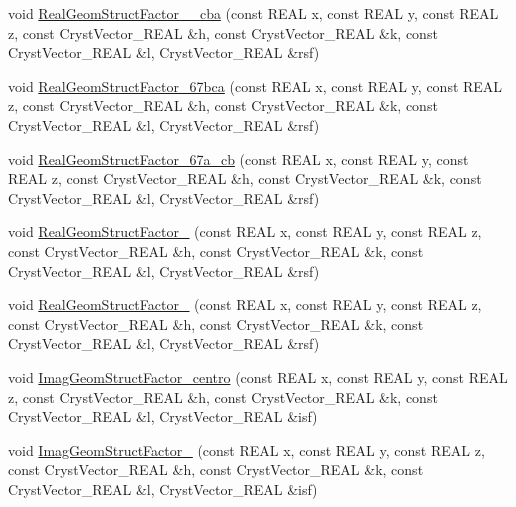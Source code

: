 \begin{DoxyCompactItemize}
\item 
void \mbox{\hyperlink{namespace_obj_cryst_a7a4f122c474f2e0c78797deeb453a7c2}{Real\+Geom\+Struct\+Factor\+\_\+\_\+cba}} (const R\+E\+AL x, const R\+E\+AL y, const R\+E\+AL z, const Cryst\+Vector\+\_\+\+R\+E\+AL \&h, const Cryst\+Vector\+\_\+\+R\+E\+AL \&k, const Cryst\+Vector\+\_\+\+R\+E\+AL \&l, Cryst\+Vector\+\_\+\+R\+E\+AL \&rsf)
\item 
void \mbox{\hyperlink{namespace_obj_cryst_a5838f57e66d4218cf94c2654970e4b44}{Real\+Geom\+Struct\+Factor\+\_\+67bca}} (const R\+E\+AL x, const R\+E\+AL y, const R\+E\+AL z, const Cryst\+Vector\+\_\+\+R\+E\+AL \&h, const Cryst\+Vector\+\_\+\+R\+E\+AL \&k, const Cryst\+Vector\+\_\+\+R\+E\+AL \&l, Cryst\+Vector\+\_\+\+R\+E\+AL \&rsf)
\item 
void \mbox{\hyperlink{namespace_obj_cryst_a07e46df75b4fd4d12e5daf4519abf4ae}{Real\+Geom\+Struct\+Factor\+\_\+67a\+\_\+cb}} (const R\+E\+AL x, const R\+E\+AL y, const R\+E\+AL z, const Cryst\+Vector\+\_\+\+R\+E\+AL \&h, const Cryst\+Vector\+\_\+\+R\+E\+AL \&k, const Cryst\+Vector\+\_\+\+R\+E\+AL \&l, Cryst\+Vector\+\_\+\+R\+E\+AL \&rsf)
\item 
void \mbox{\hyperlink{namespace_obj_cryst_a285e4956720497c97bf24cd3886bb6fa}{Real\+Geom\+Struct\+Factor\+\_}} (const R\+E\+AL x, const R\+E\+AL y, const R\+E\+AL z, const Cryst\+Vector\+\_\+\+R\+E\+AL \&h, const Cryst\+Vector\+\_\+\+R\+E\+AL \&k, const Cryst\+Vector\+\_\+\+R\+E\+AL \&l, Cryst\+Vector\+\_\+\+R\+E\+AL \&rsf)
\item 
void \mbox{\hyperlink{namespace_obj_cryst_a7b0e5b88e8b8b47365391339b31ae08d}{Real\+Geom\+Struct\+Factor\+\_}} (const R\+E\+AL x, const R\+E\+AL y, const R\+E\+AL z, const Cryst\+Vector\+\_\+\+R\+E\+AL \&h, const Cryst\+Vector\+\_\+\+R\+E\+AL \&k, const Cryst\+Vector\+\_\+\+R\+E\+AL \&l, Cryst\+Vector\+\_\+\+R\+E\+AL \&rsf)
\item 
void \mbox{\hyperlink{namespace_obj_cryst_a44411e82576a5105e9ea4a1d14444d2d}{Imag\+Geom\+Struct\+Factor\+\_\+centro}} (const R\+E\+AL x, const R\+E\+AL y, const R\+E\+AL z, const Cryst\+Vector\+\_\+\+R\+E\+AL \&h, const Cryst\+Vector\+\_\+\+R\+E\+AL \&k, const Cryst\+Vector\+\_\+\+R\+E\+AL \&l, Cryst\+Vector\+\_\+\+R\+E\+AL \&isf)
\item 
void \mbox{\hyperlink{namespace_obj_cryst_aed0db0afe1df8a2e8879aac4ac466ac0}{Imag\+Geom\+Struct\+Factor\+\_}} (const R\+E\+AL x, const R\+E\+AL y, const R\+E\+AL z, const Cryst\+Vector\+\_\+\+R\+E\+AL \&h, const Cryst\+Vector\+\_\+\+R\+E\+AL \&k, const Cryst\+Vector\+\_\+\+R\+E\+AL \&l, Cryst\+Vector\+\_\+\+R\+E\+AL \&isf)

\end{DoxyCompactItemize}
